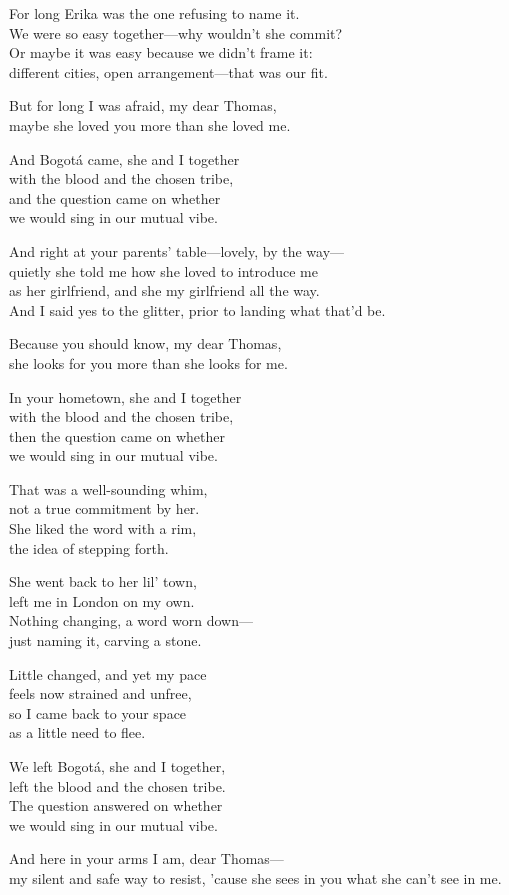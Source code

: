 \begin{lyrics}
For long Erika was the one refusing to name it.\\
We were so easy together—why wouldn’t she commit?\\
Or maybe it was easy because we didn’t frame it:\\
different cities, open arrangement—that was our fit.

But for long I was afraid, my dear Thomas,\\
maybe she loved you more than she loved me.

And Bogotá came, she and I together\\
with the blood and the chosen tribe,\\
and the question came on whether\\
we would sing in our mutual vibe.

And right at your parents’ table—lovely, by the way—\\
quietly she told me how she loved to introduce me\\
as her girlfriend, and she my girlfriend all the way.\\
And I said yes to the glitter, prior to landing what that’d be.

Because you should know, my dear Thomas,\\
she looks for you more than she looks for me.

In your hometown, she and I together\\
with the blood and the chosen tribe,\\
then the question came on whether\\
we would sing in our mutual vibe.

That was a well-sounding whim,\\
not a true commitment by her.\\
She liked the word with a rim,\\
the idea of stepping forth.

She went back to her lil’ town,\\
left me in London on my own.\\
Nothing changing, a word worn down—\\
just naming it, carving a stone.

Little changed, and yet my pace\\
feels now strained and unfree,\\
so I came back to your space\\
as a little need to flee.

We left Bogotá, she and I together,\\
left the blood and the chosen tribe.\\
The question answered on whether\\
we would sing in our mutual vibe.

And here in your arms I am, dear Thomas—\\
my silent and safe way to resist,
’cause she sees in you what she can’t see in me.
\end{lyrics}

